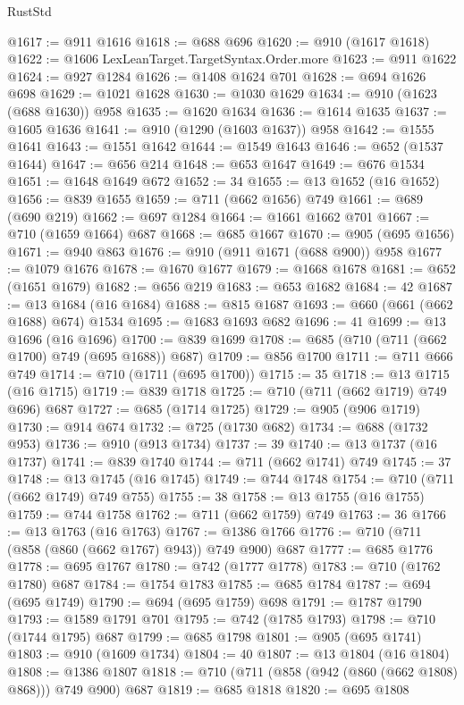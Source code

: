 \begin{lexlean}{RustStd}
\begin{coremodule}
@1617 := @911 @1616
@1618 := @688 @696
@1620 := @910 (@1617 @1618)
@1622 := @1606 LexLeanTarget.TargetSyntax.Order.more
@1623 := @911 @1622
@1624 := @927 @1284
@1626 := @1408 @1624 @701
@1628 := @694 @1626 @698
@1629 := @1021 @1628
@1630 := @1030 @1629
@1634 := @910 (@1623 (@688 @1630)) @958
@1635 := @1620 @1634
@1636 := @1614 @1635
@1637 := @1605 @1636
@1641 := @910 (@1290 (@1603 @1637)) @958
@1642 := @1555 @1641
@1643 := @1551 @1642
@1644 := @1549 @1643
@1646 := @652 (@1537 @1644)
@1647 := @656 @214
@1648 := @653 @1647
@1649 := @676 @1534
@1651 := @1648 @1649 @672
@1652 := 34
@1655 := @13 @1652 (@16 @1652)
@1656 := @839 @1655
@1659 := @711 (@662 @1656) @749
@1661 := @689 (@690 @219)
@1662 := @697 @1284
@1664 := @1661 @1662 @701
@1667 := @710 (@1659 @1664) @687
@1668 := @685 @1667
@1670 := @905 (@695 @1656)
@1671 := @940 @863
@1676 := @910 (@911 @1671 (@688 @900)) @958
@1677 := @1079 @1676
@1678 := @1670 @1677
@1679 := @1668 @1678
@1681 := @652 (@1651 @1679)
@1682 := @656 @219
@1683 := @653 @1682
@1684 := 42
@1687 := @13 @1684 (@16 @1684)
@1688 := @815 @1687
@1693 := @660 (@661 (@662 @1688) @674) @1534
@1695 := @1683 @1693 @682
@1696 := 41
@1699 := @13 @1696 (@16 @1696)
@1700 := @839 @1699
@1708 := @685 (@710 (@711 (@662 @1700) @749 (@695 @1688)) @687)
@1709 := @856 @1700
@1711 := @711 @666 @749
@1714 := @710 (@1711 (@695 @1700))
@1715 := 35
@1718 := @13 @1715 (@16 @1715)
@1719 := @839 @1718
@1725 := @710 (@711 (@662 @1719) @749 @696) @687
@1727 := @685 (@1714 @1725)
@1729 := @905 (@906 @1719)
@1730 := @914 @674
@1732 := @725 (@1730 @682)
@1734 := @688 (@1732 @953)
@1736 := @910 (@913 @1734)
@1737 := 39
@1740 := @13 @1737 (@16 @1737)
@1741 := @839 @1740
@1744 := @711 (@662 @1741) @749
@1745 := 37
@1748 := @13 @1745 (@16 @1745)
@1749 := @744 @1748
@1754 := @710 (@711 (@662 @1749) @749 @755)
@1755 := 38
@1758 := @13 @1755 (@16 @1755)
@1759 := @744 @1758
@1762 := @711 (@662 @1759) @749
@1763 := 36
@1766 := @13 @1763 (@16 @1763)
@1767 := @1386 @1766
@1776 := @710 (@711 (@858 (@860 (@662 @1767) @943)) @749 @900) @687
@1777 := @685 @1776
@1778 := @695 @1767
@1780 := @742 (@1777 @1778)
@1783 := @710 (@1762 @1780) @687
@1784 := @1754 @1783
@1785 := @685 @1784
@1787 := @694 (@695 @1749)
@1790 := @694 (@695 @1759) @698
@1791 := @1787 @1790
@1793 := @1589 @1791 @701
@1795 := @742 (@1785 @1793)
@1798 := @710 (@1744 @1795) @687
@1799 := @685 @1798
@1801 := @905 (@695 @1741)
@1803 := @910 (@1609 @1734)
@1804 := 40
@1807 := @13 @1804 (@16 @1804)
@1808 := @1386 @1807
@1818 := @710 (@711 (@858 (@942 (@860 (@662 @1808) @868))) @749 @900) @687
@1819 := @685 @1818
@1820 := @695 @1808

\end{coremodule}
\end{lexlean}
